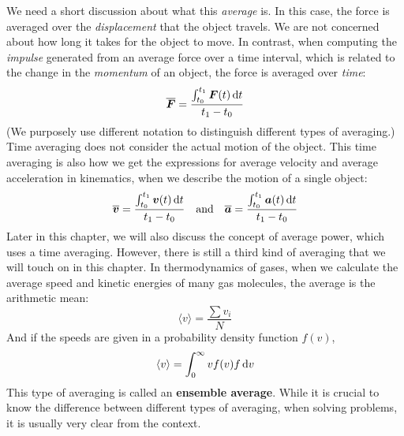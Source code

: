 \begin{remark}%
  We need a short discussion about what this \emph{average} is. In this case,
  the force is averaged over the \emph{displacement} that the object travels.
  We are not concerned about how long it takes for the object to move. In
  contrast, when computing the \emph{impulse} generated from an average force
  over a time interval, which is related to the change in the \emph{momentum}
  of an object, the force is averaged over \emph{time}:
  \begin{displaymath}
    \overline{\bm F}=\frac{\int_{t_0}^{t_1} \bm F(t)\dl t}{t_1-t_0}
  \end{displaymath}
  (We purposely use different notation to distinguish different types of
  averaging.) Time averaging does not consider the actual motion of the
  object. This time averaging is also how we get the expressions for average
  velocity and average acceleration in kinematics, when we describe the motion
  of a single object:
  \begin{displaymath}
    \overline{\bm v}=\frac{\int_{t_0}^{t_1} \bm v(t)\dl t}{t_1-t_0}
    \quad\text{and}\quad
    \overline{\bm a}=\frac{\int_{t_0}^{t_1} \bm a(t)\dl t}{t_1-t_0}
  \end{displaymath}
  Later in this chapter, we will also discuss the concept of average power,
  which uses a time averaging. However, there is still a third kind of
  averaging that we will touch on in this chapter. In thermodynamics of gases,
  when we calculate the average speed and kinetic energies of many gas
  molecules, the average is the arithmetic mean:
  \begin{displaymath}
    \langle v\rangle = \frac{\sum v_i}N
  \end{displaymath}
  And if the speeds are given in a probability density function $f(v)$,
  \begin{displaymath}
    \langle v\rangle = \int_0^\infty vf(v)f\dl v
  \end{displaymath}
  This type of averaging is called an \textbf{ensemble average}. While it is
  crucial to know the difference between different types of averaging, when
  solving problems, it is usually very clear from the context. 
\end{remark}%

